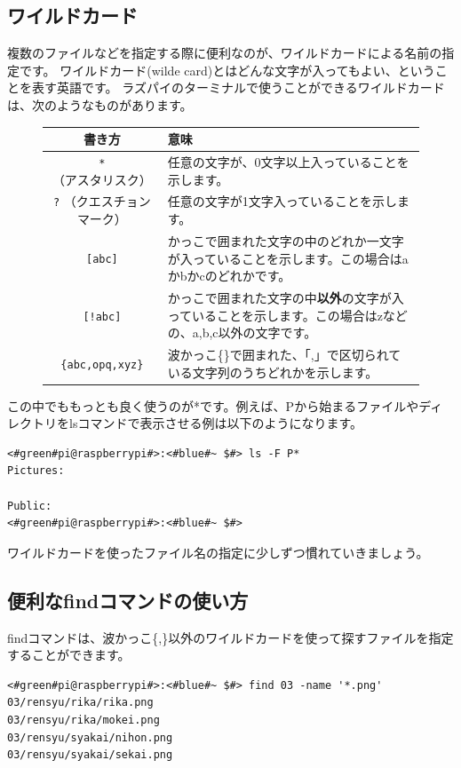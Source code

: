 \documentclass[text03.tex]{subfiles}
\begin{document}
\subsection{ワイルドカード}
複数のファイルなどを指定する際に便利なのが、ワイルドカードによる名前の指定です。
ワイルドカード(wilde card)とはどんな文字が入ってもよい、ということを表す英語です。
ラズパイのターミナルで使うことができるワイルドカードは、次のようなものがあります。
\newpage %
\begin{figure}[h]
    \begin{tabular}{cp{}} \hline
        書き方 & 意味 \\ \hline
        \texttt{*} （アスタリスク）  & 任意の文字が、0文字以上入っていることを示します。\\
        \texttt{?} （クエスチョンマーク） & 任意の文字が1文字入っていることを示します。\\
        \texttt{[abc]} & かっこで囲まれた文字の中のどれか一文字が入っていることを示します。この場合はaかbかcのどれかです。\\
        \texttt{[!abc]} & かっこで囲まれた文字の中{\bf 以外}の文字が入っていることを示します。この場合はzなどの、a,b,c以外の文字です。\\
        \texttt{\{abc,opq,xyz\}} & 波かっこ\{\}で囲まれた、「,」で区切られている文字列のうちどれかを示します。\\ \hline
    \end{tabular}
\end{figure}

この中でももっとも良く使うのが*です。例えば、Pから始まるファイルやディレクトリをlsコマンドで表示させる例は以下のようになります。
\begin{lstlisting}[caption=ワイルドカードの使い方, label=wildcard]
<#green#pi@raspberrypi#>:<#blue#~ $#> ls -F P*
Pictures:

Public:
<#green#pi@raspberrypi#>:<#blue#~ $#>
\end{lstlisting}

ワイルドカードを使ったファイル名の指定に少しずつ慣れていきましょう。

\subsection{便利なfindコマンドの使い方}
findコマンドは、波かっこ\{,\}以外のワイルドカードを使って探すファイルを指定することができます。

\begin{lstlisting}[caption=03ディレクトリからPNGファイルを探す, label=findwild]
<#green#pi@raspberrypi#>:<#blue#~ $#> find 03 -name '*.png'
03/rensyu/rika/rika.png
03/rensyu/rika/mokei.png
03/rensyu/syakai/nihon.png
03/rensyu/syakai/sekai.png
\end{lstlisting}
\end{document}
